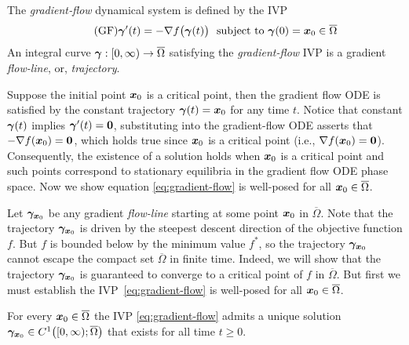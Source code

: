 \documentclass[10pt]{article}
\begin{document}
        \begin{definition}
            \label{def:grad-flow}
            The \emph{gradient‐flow} dynamical system is defined by the IVP 
            \begin{equation}
                \label{eq:gradient-flow}\tag{GF}
                \bm{\gamma}'(t) = -\nabla f\bigl(\bm{\gamma}(t)\bigr) ~\text{ subject to } \bm{\gamma}(0) = \bm{x}_0 \in \overline\Omega
            \end{equation}
            An integral curve $\bm{\gamma}:[0,\infty)\to\overline{\Omega}$ satisfying the \emph{gradient-flow} IVP is a gradient \emph{flow-line}, or, \emph{trajectory}.
        \end{definition}

        \medskip

        Suppose the initial point $\bm{x}_0$ is a critical point, then the gradient flow ODE 
        is satisfied by the constant trajectory $\bm{\gamma}(t) = \bm{x}_0$ for any time $t$. 
        Notice that constant $\bm{\gamma}(t)$ implies $\bm{\gamma}'(t) = \bm{0}$, substituting
        into the gradient-flow ODE asserts that $-\nabla f(\bm{x}_0) = \bm{0}$, which holds true
        since $\bm{x}_0$ is a critical point (i.e., $\nabla f(\bm{x}_0) = \bm{0}$).
        Consequently, the existence of a solution holds when $\bm{x}_0$ is a critical point
        and such points correspond to stationary equilibria in the gradient flow ODE phase space.
        Now we show equation \eqref{eq:gradient-flow} is well-posed for all $\bm{x}_0 \in \overline{\Omega}$.

        \medskip

        Let $\bm{\gamma}_{\bm{x}_0}$ be any gradient \emph{flow-line} starting at
        some point $\bm{x}_0$ in $\overline{\Omega}$. Note that the trajectory $\bm{\gamma}_{\bm{x}_0}$ 
        is driven by the steepest descent direction of the objective function $f$. But $f$ is bounded
        below by the minimum value $f^*$, so the trajectory $\bm{\gamma}_{\bm{x}_0}$ cannot
        escape the compact set $\overline{\Omega}$ in finite time. Indeed, we will show that the trajectory 
        $\bm{\gamma}_{\bm{x}_0}$ is guaranteed to converge to a critical point of $f$ in $\overline{\Omega}$.
        But first we must establish the IVP~\eqref{eq:gradient-flow} is well-posed for all $\bm{x}_0 \in \overline{\Omega}$.

        \begin{theorem}[Existence]\label{thm:gf-existence}
            For every $\bm{x}_0\in \overline{\Omega}$ the IVP \eqref{eq:gradient-flow} admits a
            unique solution $\bm{\gamma}_{\bm{x}_0}\in C^{1}\bigl([0,\infty);\overline{\Omega}\bigr)$
            that exists for all time $t\ge0$.
        \end{theorem}
\end{document}

